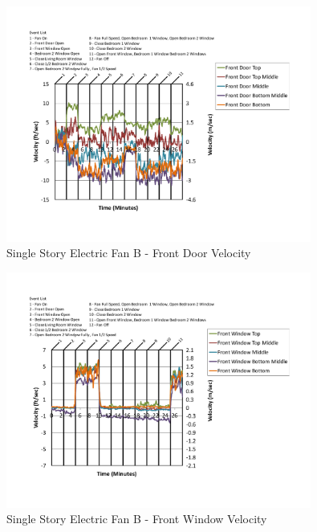 \documentclass{article}
\begin{document}
\begin{appendices}
	\begin{figure}[H]
		\centering
		\includegraphics[height=3.05in,trim=0.67in 1.1in 0.67in 0.8in,clip=true]{0_Images/Results_Charts/ColdFlow/Single_Story/Electric/B/Front_Door_Velocity.pdf}
		\caption{Single Story Electric Fan B - Front Door Velocity}
	\end{figure}
 

	\begin{figure}[H]
		\centering
		\includegraphics[height=3.05in,trim=0.67in 1.1in 0.67in 0.8in,clip=true]{0_Images/Results_Charts/ColdFlow/Single_Story/Electric/B/Front_Window_Velocity.pdf}
		\caption{Single Story Electric Fan B - Front Window Velocity}
	\end{figure}
 
	\clearpage


\end{appendices}
\end{document}
